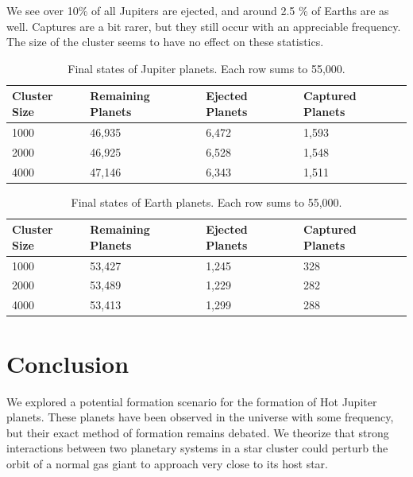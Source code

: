 \documentclass[12pt]{article}
\begin{document}
    We see over 10\% of all Jupiters are ejected, and around 2.5 \% of Earths are
    as well. Captures are a bit rarer, but they still occur with an appreciable
    frequency. The size of the cluster seems to have no effect on these statistics.

    \begin{table}[H]
        \centering
        \caption{Final states of Jupiter planets. Each row sums to 55,000.}
        \begin{tabular}{|llll|}
            \hline
            \textbf{Cluster Size} & \textbf{Remaining Planets} & \textbf{Ejected Planets} & \textbf{Captured Planets} \\
            \hline
            1000 & 46,935 & 6,472 & 1,593 \\
            2000 & 46,925 & 6,528 & 1,548 \\
            4000 & 47,146 & 6,343 & 1,511 \\
            \hline
        \end{tabular}
    \end{table}

    \begin{table}[H]
        \centering
        \caption{Final states of Earth planets. Each row sums to 55,000.}
        \begin{tabular}{|llll|}
            \hline
            \textbf{Cluster Size} & \textbf{Remaining Planets} & \textbf{Ejected Planets} & \textbf{Captured Planets} \\
            \hline
            1000 & 53,427 & 1,245 & 328 \\
            2000 & 53,489 & 1,229 & 282 \\
            4000 & 53,413 & 1,299 & 288 \\
            \hline
        \end{tabular}
    \end{table}


\section{Conclusion}

We explored a potential formation scenario for the formation of Hot Jupiter
planets. These planets have been observed in the universe with some frequency,
but their exact method of formation remains debated. 
We theorize that strong interactions between two planetary systems in a star
cluster could perturb the orbit of a normal gas giant to approach very close to
its host star. 
\end{document}
